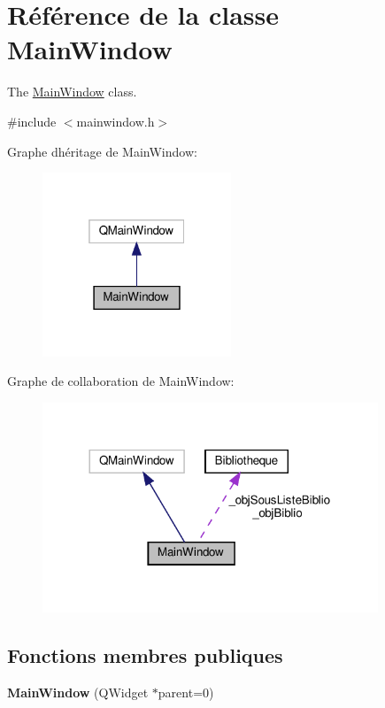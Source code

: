 \hypertarget{classMainWindow}{}\section{Référence de la classe Main\+Window}
\label{classMainWindow}


The \hyperlink{classMainWindow}{Main\+Window} class.  




{\ttfamily \#include $<$mainwindow.\+h$>$}



Graphe d\textquotesingle{}héritage de Main\+Window\+:\nopagebreak
\begin{figure}[H]
\begin{center}
\leavevmode
\includegraphics[width=160pt]{classMainWindow__inherit__graph}
\end{center}
\end{figure}


Graphe de collaboration de Main\+Window\+:\nopagebreak
\begin{figure}[H]
\begin{center}
\leavevmode
\includegraphics[width=284pt]{classMainWindow__coll__graph}
\end{center}
\end{figure}
\subsection*{Fonctions membres publiques}
\begin{DoxyCompactItemize}
\item 
\mbox{\label{classMainWindow_a8b244be8b7b7db1b08de2a2acb9409db}} 
{\bfseries Main\+Window} (Q\+Widget $\ast$parent=0)
\end{DoxyCompactItemize}
